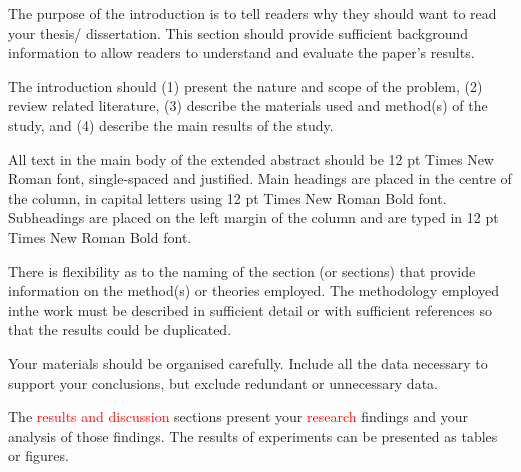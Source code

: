 \StartExtendedAbstract



The purpose of the introduction is to tell readers why they should want to read your thesis/ dissertation. This section should provide sufficient background information to allow readers to understand and evaluate the paper's results.

The introduction should (1) present the nature and scope of the problem, (2) review related literature, (3) describe the materials used and method(s) of the study, and (4) describe the main results of the study.

All text in the main body of the extended abstract should be 12 pt Times New Roman font, single-spaced and justified. Main headings are placed in the centre of the column, in capital letters using 12 pt Times New Roman Bold font. Subheadings are placed on the left margin of the column and are typed in 12 pt Times New Roman Bold font.


There is flexibility as to the naming of the section (or sections) that provide information on the method(s) or theories employed. The methodology employed inthe work must be described in sufficient detail or with sufficient references so that the results could be duplicated.

Your materials should be organised carefully. Include all the data necessary to support your conclusions, but exclude redundant or unnecessary data.


The \textcolor{red}{results and discussion} sections present your \textcolor{red}{research} findings and your analysis of those findings. The results of experiments can be presented as tables or figures.

